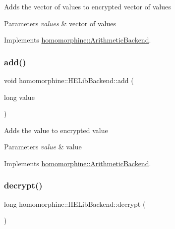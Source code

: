Adds the vector of values to encrypted vector of values


\begin{DoxyParams}{Parameters}
{\em values} & vector of values \\
\hline
\end{DoxyParams}


Implements \mbox{\hyperlink{classhomomorphine_1_1_arithmetic_backend_abf4053e05f07e566e9563a75f516daf6}{homomorphine\+::\+Arithmetic\+Backend}}.

\mbox{\label{classhomomorphine_1_1_h_e_lib_backend_a6cc00dcfc209206e67c7237934cb8d82}} 
\subsubsection{\texorpdfstring{add()}{add()}\hspace{0.1cm}{\footnotesize\ttfamily [2/2]}}
{\footnotesize\ttfamily void homomorphine\+::\+H\+E\+Lib\+Backend\+::add (\begin{DoxyParamCaption}\item[{long}]{value }\end{DoxyParamCaption})\hspace{0.3cm}{\ttfamily [virtual]}}

Adds the value to encrypted value


\begin{DoxyParams}{Parameters}
{\em value} & value \\
\hline
\end{DoxyParams}


Implements \mbox{\hyperlink{classhomomorphine_1_1_arithmetic_backend_aa1c88ebc894527a72a9fdbd35ca14204}{homomorphine\+::\+Arithmetic\+Backend}}.

\mbox{\label{classhomomorphine_1_1_h_e_lib_backend_a2cd3ebc5a3332100e6cb24480262c395}} 
\subsubsection{\texorpdfstring{decrypt()}{decrypt()}}
{\footnotesize\ttfamily long homomorphine\+::\+H\+E\+Lib\+Backend\+::decrypt (\begin{DoxyParamCaption}{ }\end{DoxyParamCaption})\hspace{0.3cm}{\ttfamily [virtual]}}

